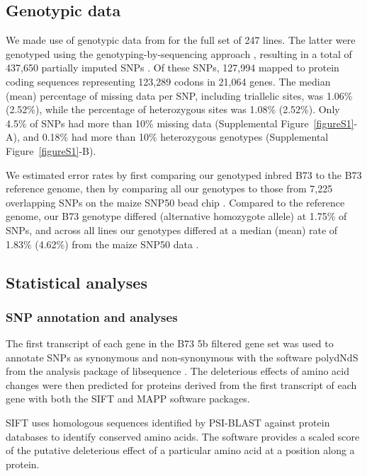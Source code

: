 \documentclass[12pt]{article}
\begin{document}
\subsection*{Genotypic data}

We made use of genotypic data from \citet{Larsson2013} for the full set of 247 lines. The latter were genotyped using the genotyping-by-sequencing approach \citep[GBS;][]{Elshire2011}, resulting in a total of 437,650 partially imputed SNPs . Of these SNPs, 127,994 mapped to protein coding sequences representing 123,289 codons in 21,064 genes. The median (mean) percentage of missing data per SNP, including triallelic sites, was 1.06\% (2.52\%), while the percentage of heterozygous sites was 1.08\% (2.52\%). Only 4.5\% of SNPs had more than 10\% missing data (Supplemental Figure~\ref{figureS1}-A), and 0.18\% had more than 10\% heterozygous genotypes (Supplemental Figure~\ref{figureS1}-B).

We estimated error rates by first comparing our genotyped inbred B73 to the B73 reference genome, then by comparing all our genotypes to those from 7,225 overlapping SNPs on the maize SNP50 bead chip \citep{Cook2012}.  
Compared to the reference genome, our B73 genotype differed (alternative homozygote allele) at 1.75\% of SNPs, and across all lines our genotypes differed at a median (mean) rate of 1.83\% (4.62\%) from the maize SNP50 data \citep{Cook2012}.   

\subsection*{Statistical analyses}

\subsubsection*{SNP annotation and analyses}
 The first transcript of each gene in the B73 5b filtered gene set was used to annotate SNPs as synonymous and non-synonymous with the software polydNdS from the analysis package of libsequence  \citep{Thornton2003}. The deleterious effects of amino acid changes were then predicted for proteins derived from the first transcript of each gene with both the SIFT \citep{Ng2003, Ng2006} and MAPP \citep{Stone2005} software packages.

SIFT uses homologous sequences identified by PSI-BLAST against protein databases to identify conserved amino acids.  
The software provides a scaled score of the putative deleterious effect of a particular amino acid at a position along a protein. 
\end{document}
